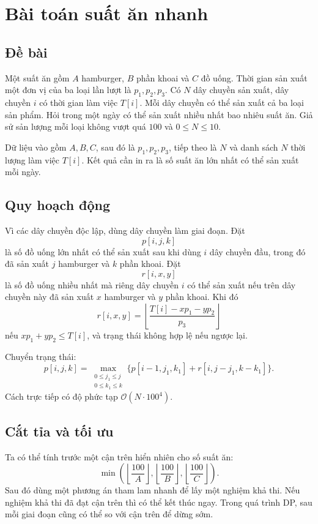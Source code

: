 \documentclass[11pt]{article}
\newcommand{\Oh}{\mathcal{O}}
\begin{document}
\section{Bài toán suất ăn nhanh}

\subsection{Đề bài}

Một suất ăn gồm \(A\) hamburger, \(B\) phần khoai và \(C\) đồ uống. Thời gian
sản xuất một đơn vị của ba loại lần lượt là \(p_1,p_2,p_3\). Có \(N\) dây
chuyền sản xuất, dây chuyền \(i\) có thời gian làm việc \(T[i]\). Mỗi dây
chuyền có thể sản xuất cả ba loại sản phẩm. Hỏi trong một ngày có thể sản xuất
nhiều nhất bao nhiêu suất ăn. Giả sử sản lượng mỗi loại không vượt quá \(100\)
và \(0\le N\le 10\).

Dữ liệu vào gồm \(A,B,C\), sau đó là \(p_1,p_2,p_3\), tiếp theo là \(N\) và
danh sách \(N\) thời lượng làm việc \(T[i]\). Kết quả cần in ra là số suất ăn
lớn nhất có thể sản xuất mỗi ngày.

\subsection{Quy hoạch động}

Vì các dây chuyền độc lập, dùng dây chuyền làm giai đoạn. Đặt
\[
  p[i,j,k]
\]
là số đồ uống lớn nhất có thể sản xuất sau khi dùng \(i\) dây chuyền đầu,
trong đó đã sản xuất \(j\) hamburger và \(k\) phần khoai. Đặt
\[
  r[i,x,y]
\]
là số đồ uống nhiều nhất mà riêng dây chuyền \(i\) có thể sản xuất nếu trên
dây chuyền này đã sản xuất \(x\) hamburger và \(y\) phần khoai. Khi đó
\[
  r[i,x,y]=
  \left\lfloor
  \frac{T[i]-xp_1-yp_2}{p_3}
  \right\rfloor
\]
nếu \(xp_1+yp_2\le T[i]\), và trạng thái không hợp lệ nếu ngược lại.

Chuyển trạng thái:
\[
  p[i,j,k]=
  \max_{\substack{0\le j_1\le j\\0\le k_1\le k}}
  \{p[i-1,j_1,k_1]+r[i,j-j_1,k-k_1]\}.
\]
Cách trực tiếp có độ phức tạp \(\Oh(N\cdot 100^4)\).

\subsection{Cắt tỉa và tối ưu}

Ta có thể tính trước một cận trên hiển nhiên cho số suất ăn:
\[
  \min\left(
    \left\lfloor\frac{100}{A}\right\rfloor,
    \left\lfloor\frac{100}{B}\right\rfloor,
    \left\lfloor\frac{100}{C}\right\rfloor
  \right).
\]
Sau đó dùng một phương án tham lam nhanh để lấy một nghiệm khả thi. Nếu nghiệm
khả thi đã đạt cận trên thì có thể kết thúc ngay. Trong quá trình DP, sau mỗi
giai đoạn cũng có thể so với cận trên để dừng sớm.
\end{document}
